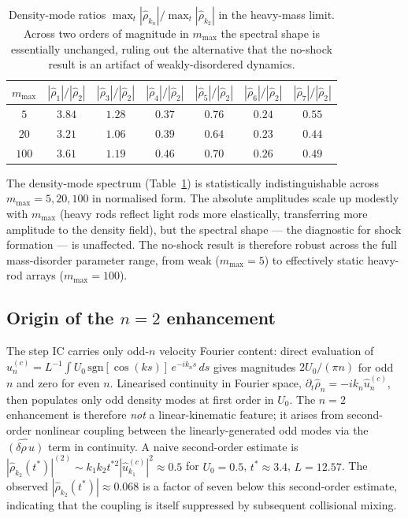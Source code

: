 \documentclass[aps,pre,twocolumn,superscriptaddress,longbibliography,floatfix]{revtex4-2}
\begin{document}
\begin{table}[t]
\centering
\caption{Density-mode ratios $\max_t|\hat\rho_{k_n}|
/\max_t|\hat\rho_{k_2}|$ in the heavy-mass limit. Across two
orders of magnitude in $m_{\max}$ the spectral shape is
essentially unchanged, ruling out the alternative that the
no-shock result is an artifact of weakly-disordered dynamics.}
\label{tab:heavy}
\begin{tabular}{ccccccc}
\hline\hline
$m_{\max}$ & $|\hat\rho_1|/|\hat\rho_2|$
           & $|\hat\rho_3|/|\hat\rho_2|$
           & $|\hat\rho_4|/|\hat\rho_2|$
           & $|\hat\rho_5|/|\hat\rho_2|$
           & $|\hat\rho_6|/|\hat\rho_2|$
           & $|\hat\rho_7|/|\hat\rho_2|$\\
\hline
$5$   & $3.84$ & $1.28$ & $0.37$ & $0.76$ & $0.24$ & $0.55$\\
$20$  & $3.21$ & $1.06$ & $0.39$ & $0.64$ & $0.23$ & $0.44$\\
$100$ & $3.61$ & $1.19$ & $0.46$ & $0.70$ & $0.26$ & $0.49$\\
\hline\hline
\end{tabular}
\end{table}

The density-mode spectrum (Table~\ref{tab:heavy}) is statistically
indistinguishable across $m_{\max}=5,20,100$ in normalised form.
The absolute amplitudes scale up modestly with $m_{\max}$
(heavy rods reflect light rods more elastically, transferring
more amplitude to the density field), but the spectral shape
--- the diagnostic for shock formation --- is unaffected. The
no-shock result is therefore robust across the full
mass-disorder parameter range, from weak ($m_{\max}=5$) to
effectively static heavy-rod arrays ($m_{\max}=100$).

\subsection{Origin of the $n=2$ enhancement}

The step IC carries only odd-$n$ velocity Fourier content:
direct evaluation of
$\hat u^{(c)}_n=L^{-1}\!\int U_0\,\mathrm{sgn}[\cos(ks)]\,
e^{-ik_n s}\,ds$ gives magnitudes $2U_0/(\pi n)$ for odd $n$
and zero for even $n$. Linearised continuity in Fourier space,
$\partial_t \hat\rho_n = -ik_n \hat u^{(c)}_n$, then populates
only odd density modes at first order in $U_0$. The $n=2$
enhancement is therefore \emph{not} a linear-kinematic
feature; it arises from second-order nonlinear coupling between
the linearly-generated odd modes via the
$\widehat{(\delta\rho\,u)}$ term in continuity. A naive
second-order estimate is
$|\hat\rho_{k_2}(t^*)|^{(2)} \sim k_1 k_2 t^{*2}
|\hat u_{k_1}^{(c)}|^2 \approx 0.5$
for $U_0=0.5$, $t^*\approx 3.4$, $L=12.57$. The observed
$|\hat\rho_{k_2}(t^*)| \approx 0.068$ is a factor of seven
below this second-order estimate, indicating that the coupling
is itself suppressed by subsequent collisional mixing.
\end{document}

